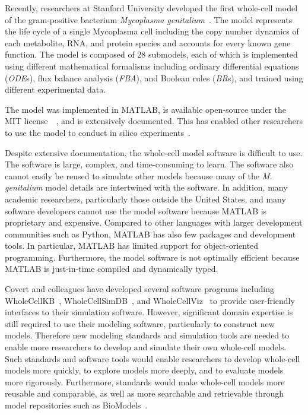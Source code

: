 \documentclass[journal,transmag]{IEEEtran}
\begin{document}
Recently, researchers at Stanford University developed the first whole-cell model of the gram-positive bacterium \textit{Mycoplasma genitalium}~\cite{Karr2012}. The model represents the life cycle of a single Mycoplasma cell including the copy number dynamics of each metabolite, RNA, and protein species and accounts for every known gene function. The model is composed of 28 submodels, each of which is implemented using different mathematical formalisms including ordinary differential equations (\emph{ODE}s), flux balance analysis (\emph{FBA}), and Boolean rules (\emph{BR}s), and trained using different experimental data.

The model was implemented in MATLAB, is available open-source under the MIT license~\cite{wholeCell}~\cite{wholeCell}, and is extensively documented. This has enabled other researchers to use the model to conduct in silico experiments~\cite{Sanghvi2013, Purcell2013, Kazakiewicz2015}. 

Despite extensive documentation, the whole-cell model software is difficult to use. The software is large, complex, and time-consuming to learn. The software also cannot easily be reused to simulate other models because many of the \textit{M. genitalium} model details are intertwined with the software. In addition, many academic researchers, particularly those outside the United States, and many software developers cannot use the model software because MATLAB is proprietary and expensive. Compared to other languages with larger development communities such as Python, MATLAB has also few packages and development tools. In particular, MATLAB has limited support for object-oriented programming. Furthermore, the model software is not optimally efficient because MATLAB is just-in-time compiled and dynamically typed.

Covert and colleagues have developed several software programs including WholeCellKB~\cite{Karr2013}, WholeCellSimDB~\cite{Karr2014}, and WholeCellViz~\cite{Lee2013} to provide user-friendly interfaces to their simulation software. However, significant domain expertise is still required to use their modeling software, particularly to construct new models. Therefore new modeling standards and simulation tools are needed to enable more researchers to develop and simulate their own whole-cell models. Such standards and software tools would enable researchers to develop whole-cell models more quickly, to explore models more deeply, and to evaluate models more rigorously. Furthermore, standards would make whole-cell models more reusable and comparable, as well as more searchable and retrievable through model repositories such as BioModels~\cite{juty2015biomodels,chelliah2015biomodels}.
\end{document}
